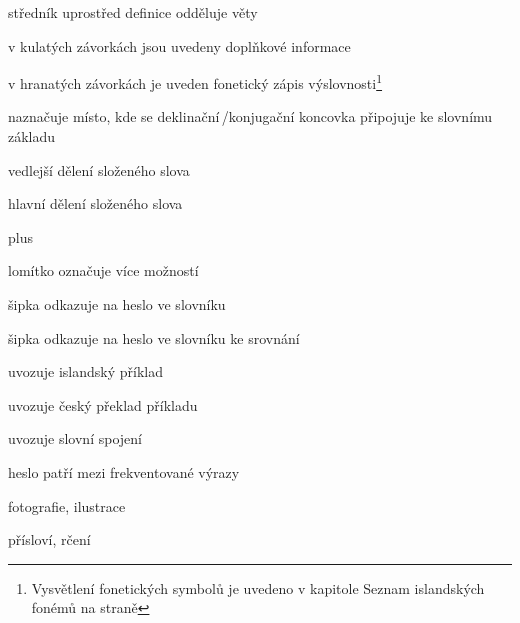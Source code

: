\item[{;}] {středník uprostřed definice odděluje věty}

\item[{(...)}] {v kulatých závorkách jsou uvedeny doplňkové informace}
\item[{[...]}] {v hranatých závorkách je uveden fonetický zápis výslovnosti}\footnote{Vysvětlení fonetických symbolů je uvedeno v kapitole Seznam islandských fonémů na straně \pageref{sec:phon_phonems}}
\item[{|}] {naznačuje místo, kde se deklinační\,/\addthin konjugační koncovka připojuje ke slovnímu základu}
\item[{·}] {vedlejší dělení složeného slova}
\item[{··}] {hlavní dělení složeného slova}
\item[{+}] {plus}
\item[{/}] {lomítko označuje více možností}
\item[{\dicsymSee}] {šipka odkazuje na heslo ve slovníku}
\item[{\dicsymCompare}] {šipka odkazuje na heslo ve slovníku ke srovnání}
\item[{\dicsymExampleIS}] {uvozuje islandský příklad}
\item[{\dicsymExampleCS}] {uvozuje český překlad příkladu}
\item[{\dicsymIdiom}] {uvozuje slovní spojení}
\item[{\dicsymFrequent}] {heslo patří mezi frekventované výrazy}

\item[{\dicsymPhoto}] {fotografie, ilustrace}
\item[{\dicsymProverb}] {přísloví, rčení}
